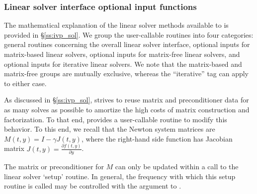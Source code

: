 \subsubsection{Linear solver interface optional input functions}
\label{sss:optin_ls}

The mathematical explanation of the linear solver methods
available to {\cvodes} is provided in \S\ref{ss:ivp_sol}.  We
group the user-callable routines into four categories: general
routines concerning the overall {\cvls} linear solver interface,
optional inputs for matrix-based linear solvers, optional inputs for
matrix-free linear solvers, and optional inputs for iterative linear
solvers.  We note that the matrix-based and matrix-free groups are
mutually exclusive, whereas the ``iterative'' tag can apply to either
case.

As discussed in \S\ref{ss:ivp_sol}, {\cvodes} strives to reuse matrix
and preconditioner data for as many solves as possible to amortize the
high costs of matrix construction and factorization.  To that end,
{\cvodes} provides a user-callable routine to modify this behavior.  To
this end, we recall that the Newton system matrices are $M(t,y) = I -
\gamma J(t,y)$, where the right-hand side function has Jacobian matrix
$J(t,y) = \frac{\partial f(t,y)}{\partial y}$.

The matrix or preconditioner for $M$ can only be updated within a call
to the linear solver `setup' routine.  In general, the frequency with
which this setup routine is called may be controlled with the
 argument to .


